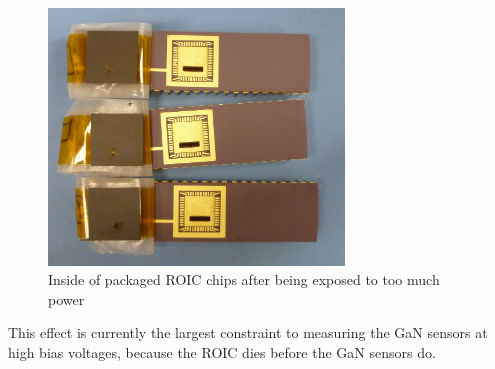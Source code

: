 \begin{figure}[H]
	    \centering
	    \includegraphics[width=0.7\textwidth]{fig/burned_chips.JPG}
	    \caption[]%
	    {Inside of packaged ROIC chips after being exposed to too much power}    
	    \label{fig:burned_chips}	
\end{figure}  

This effect is currently the largest constraint to measuring the GaN sensors at high bias voltages, because the ROIC dies before the GaN sensors do.

